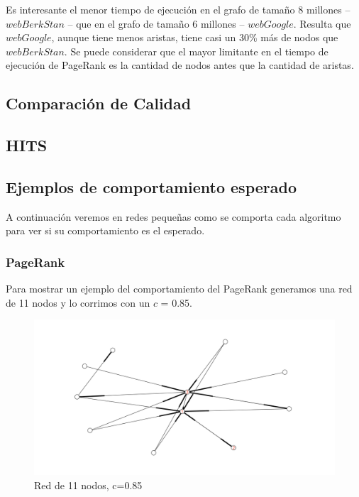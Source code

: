 Es interesante el menor tiempo de ejecución en el grafo de tamaño 8 millones -- $webBerkStan$ -- que en el grafo de tamaño 6 millones -- $webGoogle$. Resulta que $webGoogle$, aunque tiene menos aristas, tiene casi un 30\% más de nodos que $webBerkStan$. Se puede considerar que el mayor limitante en el tiempo de ejecución de PageRank es la cantidad de nodos antes que la cantidad de aristas.

\subsection{Comparación de Calidad}

\subsection{HITS}


\subsection{Ejemplos de comportamiento esperado}

A continuación veremos en redes pequeñas como se comporta cada algoritmo para ver si su comportamiento es el esperado.

\subsubsection{PageRank}
Para mostrar un ejemplo del comportamiento del PageRank generamos una red de 11 nodos y lo corrimos con un $c$ = 0.85.

 \begin{figure}[!htb]
\begin{center}
    \includegraphics[scale=0.5]{imagenes/test5.png}
    \caption{Red de 11 nodos, c=0.85}
    \end{center}
\end{figure}

